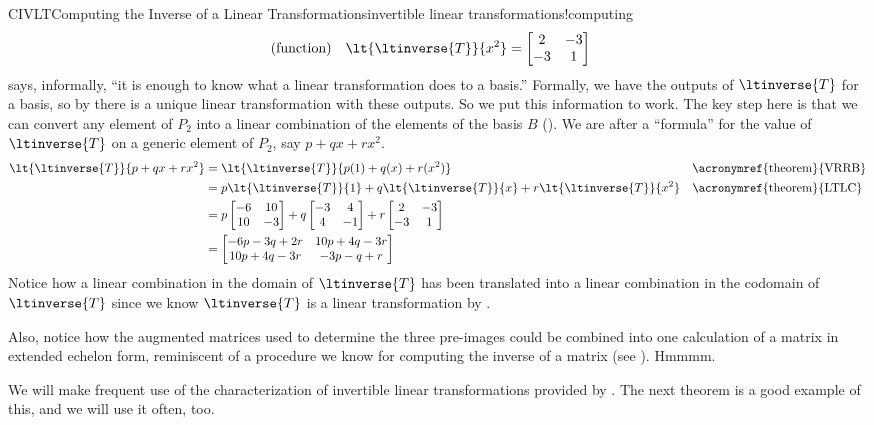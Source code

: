 \begin{example}{CIVLT}{Computing the Inverse of a Linear Transformations}{invertible linear transformations!computing}
\begin{align*}
%
&\text{(function)}&\lt{\ltinverse{T}}{x^2}
&=
\begin{bmatrix}2&-3\\-3&1\end{bmatrix}
\end{align*}
%
 says, informally, ``it is enough to know what a linear transformation does to a basis.''  Formally, we have the outputs of $\ltinverse{T}$ for a basis, so by  there is a unique linear transformation with these outputs.  So we put this information to work.  The key step here is that we can convert any element of $P_2$ into a linear combination of the elements of the basis $B$ ().  We are after a ``formula'' for the value of $\ltinverse{T}$ on a generic element of $P_2$, say $p+qx+rx^2$.
%
\begin{align*}
\lt{\ltinverse{T}}{p+qx+rx^2}
&=
\lt{\ltinverse{T}}{p(1)+q(x)+r(x^2)}
&&\text{\acronymref{theorem}{VRRB}}\\
&=
p\lt{\ltinverse{T}}{1}+
q\lt{\ltinverse{T}}{x}+
r\lt{\ltinverse{T}}{x^2}
&&\text{\acronymref{theorem}{LTLC}}\\
&=
p\begin{bmatrix}-6&10\\10&-3\end{bmatrix}+
q\begin{bmatrix}-3&4\\4&-1\end{bmatrix}+
r\begin{bmatrix}2&-3\\-3&1\end{bmatrix}\\
&=
\begin{bmatrix}
-6p-3q+2r & 10p+4q-3r \\
10p+4q-3r & -3p -q + r
\end{bmatrix}
\end{align*}
%
Notice how a linear combination in the domain of $\ltinverse{T}$ has been translated into a linear combination in the codomain of $\ltinverse{T}$ since we know $\ltinverse{T}$ is a linear transformation by .\par
%
Also, notice how the augmented matrices used to determine the three pre-images could be combined into one calculation of a matrix in extended echelon form, reminiscent of a procedure we know for computing the inverse of a matrix (see ).  Hmmmm.
%
\end{example}
%
We will make frequent use of the characterization of invertible linear transformations provided by .  The next theorem is a good example of this, and we will use it often, too.
